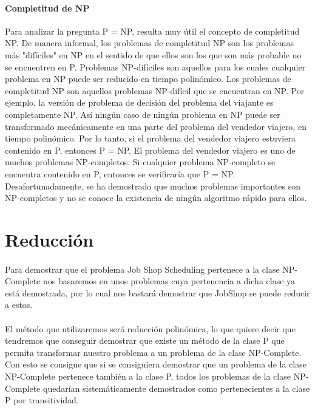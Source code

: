 \documentclass[11pt, a4paper,spanish]{article}
\begin{document}
				\paragraph{Completitud de NP}
				Para analizar la pregunta P = NP, resulta muy útil el concepto de completitud NP. De manera informal, los problemas de completitud NP son los problemas más "difíciles" en NP en el sentido de que ellos son los que son más probable no se encuentren en P. Problemas NP-difíciles son aquellos para los cuales cualquier problema en NP puede ser reducido en tiempo polinómico. Los problemas de completitud NP son aquellos problemas NP-difícil que se encuentran en NP. Por ejemplo, la versión de problema de decisión del problema del viajante es completamente NP. Así ningún caso de ningún problema en NP puede ser transformado mecánicamente en una parte del problema del vendedor viajero, en tiempo polinómico. Por lo tanto, si el problema del vendedor viajero estuviera contenido en P, entonces P = NP. El problema del vendedor viajero es uno de muchos problemas NP-completos. Si cualquier problema NP-completo se encuentra contenido en P, entonces se verificaría que P = NP. Desafortunadamente, se ha demostrado que muchos problemas importantes son NP-completos y no se conoce la existencia de ningún algoritmo rápido para ellos.
				
		\section{Reducción}
		
			\paragraph{}
			Para demostrar que el problema Job Shop Scheduling pertenece a la clase NP-Complete nos basaremos en unos problemas cuya pertenencia a dicha clase ya está demostrada, por lo cual nos bastará demostrar que JobShop se puede reducir a estos. 
			
			\paragraph{}
			El método que utilizaremos será reducción polinómica, lo que quiere decir que tendremos que conseguir demostrar que existe un método de la clase P que permita transformar nuestro problema a un problema de la clase NP-Complete. Con esto se consigue que si se consiguiera demostrar que un problema de la clase NP-Complete pertenece también a la clase P, todos los problemas de la clase NP-Complete quedarían sistemáticamente demostrados como pertenecientes a la clase P por transitividad.
\end{document}
